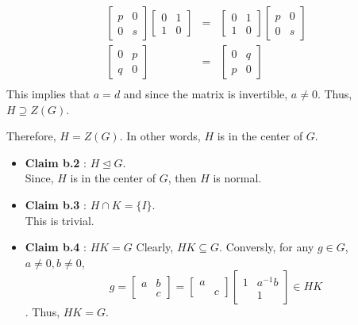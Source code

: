 \documentclass[
]{book}
\begin{document}
\begin{eqnarray}
\begin{bmatrix}
p & 0 \\
0 & s
\end{bmatrix}\begin{bmatrix}
0 & 1 \\
1 & 0
\end{bmatrix} &=& \begin{bmatrix}
0 & 1 \\
1 & 0
\end{bmatrix}\begin{bmatrix}
p & 0 \\
0 & s
\end{bmatrix}\\
\begin{bmatrix}
0 & p \\
q & 0
\end{bmatrix}&=& \begin{bmatrix}
0 & q \\
p & 0
\end{bmatrix}\\
\end{eqnarray} This implies that \(a = d\) and since the matrix is
invertible, \(a\neq 0\). Thus, \(H \supseteq Z(G)\).

Therefore, \(H = Z(G)\). In other words, \(H\) is in the center of
\(G\).

\begin{itemize}
\item
  \textbf{Claim b.2} : \(H\trianglelefteq G\).\\
  Since, \(H\) is in the center of \(G\), then \(H\) is normal.
\item
  \textbf{Claim b.3} : \(H\cap K=\{I\}\).\\
  This is trivial.
\item
  \textbf{Claim b.4} : \(HK=G\) Clearly, \(HK\subseteq G\). Conversly,
  for any \(g\in G\), \(a\neq 0, b\neq 0\), \[g=\begin{bmatrix}
  a & b \\
  & c
  \end{bmatrix}=\begin{bmatrix}
  a &  \\
  & c
  \end{bmatrix}\begin{bmatrix}
  1 & a^{-1}b \\
  & 1
  \end{bmatrix}\in HK\]. Thus, \(HK=G\).
\end{itemize}
\end{document}
